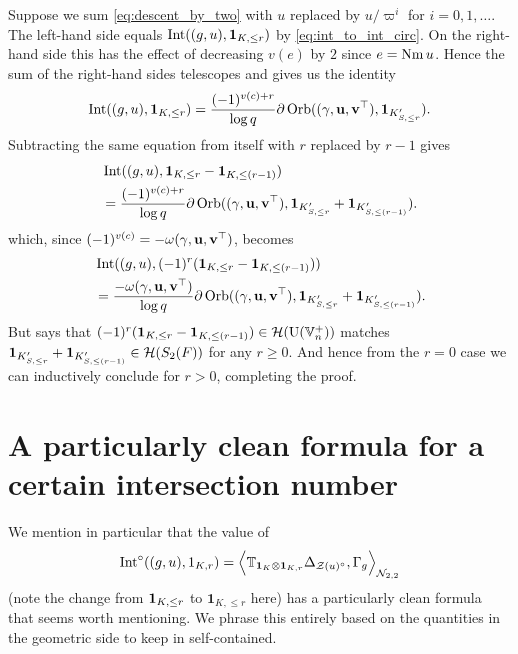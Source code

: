 Suppose we sum \eqref{eq:descent_by_two} with $u$ replaced by
$u/\varpi^i$ for $i = 0, 1, \dots$.
The left-hand side equals $\operatorname{Int}((g,u), \mathbf{1}_{K, \le r})$ by \eqref{eq:int_to_int_circ}.
On the right-hand side this has the effect of decreasing $v(e)$ by $2$ since $e = \operatorname{Nm} u$.
Hence the sum of the right-hand sides telescopes and gives us the identity
\begin{equation}
  \operatorname{Int}((g,u), \mathbf{1}_{K, \le r})
  = \frac{(-1)^{v(c)+r}}{\log q}
    \partial\operatorname{Orb}({(\gamma, \mathbf u, \mathbf v^\top)}, \mathbf{1}_{K'_{S, \le r}}).
  \label{eq:match_penultimate}
\end{equation}
Subtracting the same equation from itself with $r$ replaced by $r-1$ gives
\begin{align*}
  &\operatorname{Int}((g,u), \mathbf{1}_{K, \le r} - \mathbf{1}_{K, \le (r-1)}) \\
  &= \frac{(-1)^{v(c)+r}}{\log q}
    \partial \operatorname{Orb}({(\gamma, \mathbf u, \mathbf v^\top)}, \mathbf{1}_{K'_{S, \le r}} + \mathbf{1}_{K'_{S, \le (r-1)}}).
\end{align*}
which, since $(-1)^{v(c)} = -\omega{(\gamma, \mathbf u, \mathbf v^\top)}$, becomes
\begin{equation}
  \begin{aligned}
    &\operatorname{Int}((g,u), (-1)^r(\mathbf{1}_{K, \le r} - \mathbf{1}_{K, \le (r-1)})) \\
    &= \frac{-\omega{(\gamma, \mathbf u, \mathbf v^\top)}}{\log q}
    \partial \operatorname{Orb}({(\gamma, \mathbf u, \mathbf v^\top)}, \mathbf{1}_{K'_{S, \le r}} + \mathbf{1}_{K'_{S, \le (r-1)}}).
  \end{aligned}
  \label{eq:match_final}
\end{equation}
But  says that
$(-1)^r(\mathbf{1}_{K, \le r} - \mathbf{1}_{K, \le (r-1)}) \in \mathcal H(\operatorname{U}(\mathbb V_n^+))$
matches $\mathbf{1}_{K'_{S, \le r}} + \mathbf{1}_{K'_{S, \le (r-1)}} \in \mathcal H(S_2(F))$
for any $r \ge 0$.
And hence from the $r = 0$ case we can inductively conclude
 for $r > 0$, completing the proof.

\section{A particularly clean formula for a certain intersection number}
We mention in particular that the value of
\[ \operatorname{Int}^\circ((g,u), 1_{K,r})
  = \Big\langle \mathbb{T}_{\mathbf{1}_K \otimes \mathbf{1}_{K, r}}
    \Delta_{\mathcal Z(u)^\circ}, \Gamma_g \Big\rangle_{\mathcal N_{2,2}} \]
(note the change from $\mathbf{1}_{K, \le r}$ to $\mathbf{1}_{K, \le r}$ here)
has a particularly clean formula that seems worth mentioning.
We phrase this entirely based on the quantities in the geometric side to keep in self-contained.

